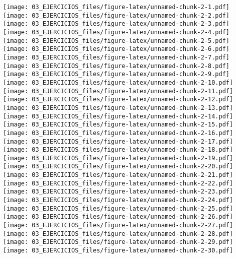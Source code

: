 \documentclass[
]{book}
\begin{document}
\texttt{[image: 03\_EJERCICIOS\_files/figure-latex/unnamed-chunk-2-1.pdf]} \texttt{[image: 03\_EJERCICIOS\_files/figure-latex/unnamed-chunk-2-2.pdf]} \texttt{[image: 03\_EJERCICIOS\_files/figure-latex/unnamed-chunk-2-3.pdf]} \texttt{[image: 03\_EJERCICIOS\_files/figure-latex/unnamed-chunk-2-4.pdf]} \texttt{[image: 03\_EJERCICIOS\_files/figure-latex/unnamed-chunk-2-5.pdf]} \texttt{[image: 03\_EJERCICIOS\_files/figure-latex/unnamed-chunk-2-6.pdf]} \texttt{[image: 03\_EJERCICIOS\_files/figure-latex/unnamed-chunk-2-7.pdf]} \texttt{[image: 03\_EJERCICIOS\_files/figure-latex/unnamed-chunk-2-8.pdf]} \texttt{[image: 03\_EJERCICIOS\_files/figure-latex/unnamed-chunk-2-9.pdf]} \texttt{[image: 03\_EJERCICIOS\_files/figure-latex/unnamed-chunk-2-10.pdf]} \texttt{[image: 03\_EJERCICIOS\_files/figure-latex/unnamed-chunk-2-11.pdf]} \texttt{[image: 03\_EJERCICIOS\_files/figure-latex/unnamed-chunk-2-12.pdf]} \texttt{[image: 03\_EJERCICIOS\_files/figure-latex/unnamed-chunk-2-13.pdf]} \texttt{[image: 03\_EJERCICIOS\_files/figure-latex/unnamed-chunk-2-14.pdf]} \texttt{[image: 03\_EJERCICIOS\_files/figure-latex/unnamed-chunk-2-15.pdf]} \texttt{[image: 03\_EJERCICIOS\_files/figure-latex/unnamed-chunk-2-16.pdf]} \texttt{[image: 03\_EJERCICIOS\_files/figure-latex/unnamed-chunk-2-17.pdf]} \texttt{[image: 03\_EJERCICIOS\_files/figure-latex/unnamed-chunk-2-18.pdf]} \texttt{[image: 03\_EJERCICIOS\_files/figure-latex/unnamed-chunk-2-19.pdf]} \texttt{[image: 03\_EJERCICIOS\_files/figure-latex/unnamed-chunk-2-20.pdf]} \texttt{[image: 03\_EJERCICIOS\_files/figure-latex/unnamed-chunk-2-21.pdf]} \texttt{[image: 03\_EJERCICIOS\_files/figure-latex/unnamed-chunk-2-22.pdf]} \texttt{[image: 03\_EJERCICIOS\_files/figure-latex/unnamed-chunk-2-23.pdf]} \texttt{[image: 03\_EJERCICIOS\_files/figure-latex/unnamed-chunk-2-24.pdf]} \texttt{[image: 03\_EJERCICIOS\_files/figure-latex/unnamed-chunk-2-25.pdf]} \texttt{[image: 03\_EJERCICIOS\_files/figure-latex/unnamed-chunk-2-26.pdf]} \texttt{[image: 03\_EJERCICIOS\_files/figure-latex/unnamed-chunk-2-27.pdf]} \texttt{[image: 03\_EJERCICIOS\_files/figure-latex/unnamed-chunk-2-28.pdf]} \texttt{[image: 03\_EJERCICIOS\_files/figure-latex/unnamed-chunk-2-29.pdf]} \texttt{[image: 03\_EJERCICIOS\_files/figure-latex/unnamed-chunk-2-30.pdf]}
\end{document}
